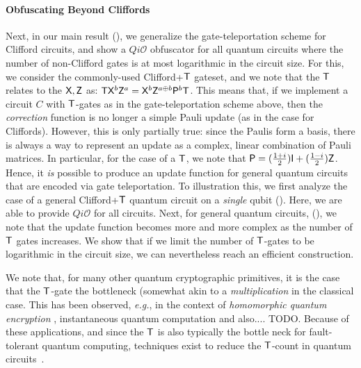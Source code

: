 \paragraph{Obfuscating Beyond Cliffords} Next, in our main result (), we generalize the gate-teleportation scheme for Clifford circuits, and show a $Qi\mathcal{O}$ obfuscator for all quantum circuits where the number of non-Clifford  gates is at most logarithmic in the circuit size. For this, we consider the commonly-used Clifford+${\sf T}$ gateset, and we note that the ${\sf T}$ relates to the ${\sf X}, {\sf Z}$ as: ${\sf T} {\sf X}^b {\sf Z}^a={\sf X}^b {\sf Z}^{a\oplus b}{\sf P}^b {\sf T}$. This means that, if we implement a circuit $C$ with ${\sf T}$-gates as in the gate-teleportation scheme above, then the \emph{correction} function is no longer a simple Pauli update (as in the case for Cliffords). However, this is only partially true: since the Paulis form a basis, there is always a way to represent an update as a complex, linear combination of Pauli matrices. In particular, for the case of a ${\sf T}$, we note that ${\sf P}=(\frac{1+i}{2}) {\sf I} + (\frac{1-i}{2}){\sf Z}$. Hence, it \emph{is} possible to produce an update function for general quantum circuits that are encoded via gate teleportation. To illustration this, we first analyze the case of a general Clifford+${\sf T}$ quantum circuit on a \emph{single} qubit (). Here, we are able to provide $Qi\mathcal{O}$ for all circuits. Next, for general quantum circuits, (), we note that the update function becomes more and more complex as the number of ${\sf T}$ gates increases. We show that if we limit the number of ${\sf T}$-gates to be logarithmic in the circuit size, we can nevertheless reach an efficient construction.


We note that,  for many other quantum cryptographic primitives, it is the case that the ${\sf T}$-gate the bottleneck (somewhat akin to a \emph{multiplication} in the classical case. This has been observed, \emph{e.g.}, in the context of \emph{homomorphic quantum encryption} \cite{BJ15}, instantaneous quantum computation \cite{TODO} and also.... TODO. Because of these applications, and since the ${\sf T}$ is also typically the bottle neck for fault-tolerant quantum computing, techniques exist to reduce the ${\sf T}$-count in quantum circuits~\cite{AMMR13,DMM16,AMM14}.



